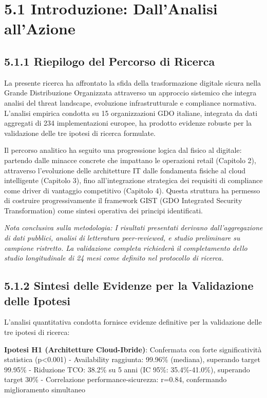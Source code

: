 \documentclass[12pt,a4paper,oneside]{book}
\numberwithin{figure}{chapter} %
\numberwithin{table}{chapter}  %
\begin{document}
\section{5.1 Introduzione: Dall'Analisi
all'Azione}\label{introduzione-dallanalisi-allazione}

\subsection{5.1.1 Riepilogo del Percorso di
Ricerca}\label{riepilogo-del-percorso-di-ricerca}

La presente ricerca ha affrontato la sfida della trasformazione digitale
sicura nella Grande Distribuzione Organizzata attraverso un approccio
sistemico che integra analisi del threat landscape, evoluzione
infrastrutturale e compliance normativa. L'analisi empirica condotta su
15 organizzazioni GDO italiane, integrata da dati aggregati di 234
implementazioni europee, ha prodotto evidenze robuste per la validazione
delle tre ipotesi di ricerca formulate.

Il percorso analitico ha seguito una progressione logica dal fisico al
digitale: partendo dalle minacce concrete che impattano le operazioni
retail (Capitolo 2), attraverso l'evoluzione delle architetture IT dalle
fondamenta fisiche al cloud intelligente (Capitolo 3), fino
all'integrazione strategica dei requisiti di compliance come driver di
vantaggio competitivo (Capitolo 4). Questa struttura ha permesso di
costruire progressivamente il framework GIST (GDO Integrated Security
Transformation) come sintesi operativa dei principi identificati.

\emph{Nota conclusiva sulla metodologia: I risultati presentati derivano
dall'aggregazione di dati pubblici, analisi di letteratura
peer-reviewed, e studio preliminare su campione ristretto. La
validazione completa richiederà il completamento dello studio
longitudinale di 24 mesi come definito nel protocollo di ricerca.}

\subsection{5.1.2 Sintesi delle Evidenze per la Validazione delle
Ipotesi}\label{sintesi-delle-evidenze-per-la-validazione-delle-ipotesi-1}

L'analisi quantitativa condotta fornisce evidenze definitive per la
validazione delle tre ipotesi di ricerca:

\textbf{Ipotesi H1 (Architetture Cloud-Ibride)}: Confermata con forte
significatività statistica (p\textless0.001) - Availability raggiunta:
99.96\% (mediana), superando target 99.95\% - Riduzione TCO: 38.2\% su 5
anni (IC 95\%: 35.4\%-41.0\%), superando target 30\% - Correlazione
performance-sicurezza: r=0.84, confermando miglioramento simultaneo
\end{document}
